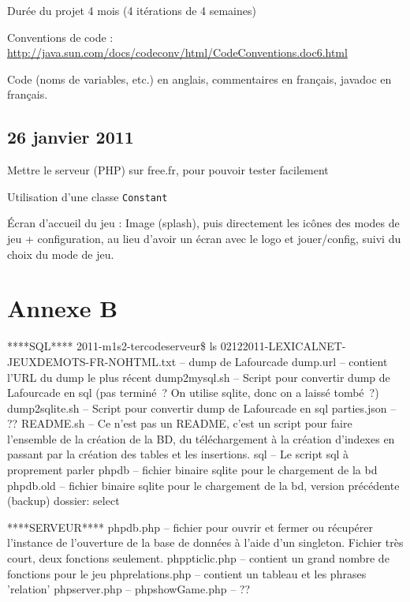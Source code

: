 \documentclass[a4paper,11pt,french]{article}
\begin{document}
Durée du projet 4 mois (4 itérations de 4 semaines)

Conventions de code : \url{http://java.sun.com/docs/codeconv/html/CodeConventions.doc6.html}

Code (noms de variables, etc.) en anglais, commentaires en français, javadoc en français.

\subsection{26 janvier 2011}
Mettre le serveur (PHP) sur free.fr, pour pouvoir tester facilement

Utilisation d'une classe \verb!Constant!

Écran d'accueil du jeu : Image (splash), puis directement les icônes des modes de jeu + configuration, au lieu d'avoir un écran avec le logo et jouer/config, suivi du choix du mode de jeu.

\section{Annexe B}


****SQL****
2011-m1s2-ter\/code\/serveur\$ ls
02122011-LEXICALNET-JEUXDEMOTS-FR-NOHTML.txt  -- dump de Lafourcade
dump.url -- contient l'URL du dump le plus récent
dump2mysql.sh -- Script pour convertir dump de Lafourcade en sql (pas terminé~? On utilise sqlite, donc on a laissé tombé~?)
dump2sqlite.sh  -- Script pour convertir dump de Lafourcade en sql
parties.json  -- ??
README.sh -- Ce n'est pas un README, c'est un script pour faire l'ensemble de la création de la BD, du téléchargement à la création d'indexes en passant par la création des tables et les insertions.
sql -- Le script sql à proprement parler
php\/db -- fichier binaire sqlite pour le chargement de la bd
php\/db.old -- fichier binaire sqlite pour le chargement de la bd, version précédente (backup)
dossier: select

****SERVEUR****
php\/db.php -- fichier pour ouvrir et fermer ou récupérer l'instance de l'ouverture de la base de données à l'aide d'un singleton. 
		Fichier très court, deux fonctions seulement.
php\/pticlic.php -- contient un grand nombre de fonctions pour le jeu
php\/relations.php -- contient un tableau et les phrases 'relation'
php\/server.php --
php\/showGame.php -- ??
\end{document}

